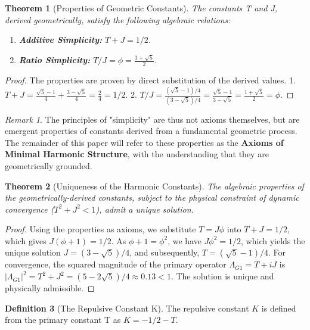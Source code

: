 \documentclass{article}
\theoremstyle{plain}
\newtheorem{theorem}{Theorem}[section]
\theoremstyle{definition}
\newtheorem{definition}[theorem]{Definition}
\theoremstyle{remark}
\newtheorem*{remark}{Remark}
\begin{document}
\begin{theorem}[Properties of Geometric Constants]
The constants T and J, derived geometrically, satisfy the following algebraic relations:
\begin{enumerate}
    \item \textbf{Additive Simplicity:} $T+J = 1/2$.
    \item \textbf{Ratio Simplicity:} $T/J = \phi = \frac{1+\sqrt{5}}{2}$.
\end{enumerate}
\end{theorem}
\begin{proof}
The properties are proven by direct substitution of the derived values.
1. $T+J = \frac{\sqrt{5}-1}{4} + \frac{3-\sqrt{5}}{4} = \frac{2}{4} = 1/2$.
2. $T/J = \frac{(\sqrt{5}-1)/4}{(3-\sqrt{5})/4} = \frac{\sqrt{5}-1}{3-\sqrt{5}} = \frac{1+\sqrt{5}}{2} = \phi$.
\end{proof}

\begin{remark}
The principles of "simplicity" are thus not axioms themselves, but are emergent properties of constants derived from a fundamental geometric process. The remainder of this paper will refer to these properties as the \textbf{Axioms of Minimal Harmonic Structure}, with the understanding that they are geometrically grounded.
\end{remark}

\begin{theorem}[Uniqueness of the Harmonic Constants]
The algebraic properties of the geometrically-derived constants, subject to the physical constraint of dynamic convergence ($T^2+J^2 < 1$), admit a unique solution.
\end{theorem}
\begin{proof}
Using the properties as axioms, we substitute $T=J\phi$ into $T+J=1/2$, which gives $J(\phi+1)=1/2$. As $\phi+1=\phi^2$, we have $J\phi^2=1/2$, which yields the unique solution $J=(3-\sqrt{5})/4$, and subsequently, $T=(\sqrt{5}-1)/4$. For convergence, the squared magnitude of the primary operator $\Lambda_{G1} = T+iJ$ is $|\Lambda_{G1}|^2 = T^2+J^2 = (5-2\sqrt{5})/4 \approx 0.13 < 1$. The solution is unique and physically admissible.
\end{proof}

\begin{definition}[The Repulsive Constant K]
The repulsive constant $K$ is defined from the primary constant T as $K = -1/2 - T$.
\end{definition}
\end{document}

